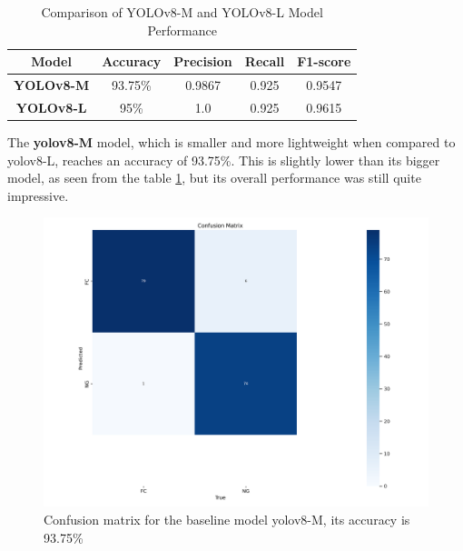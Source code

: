 \begin{table}[ht!]
    \centering
    \begin{tabular}{|c|c|c|c|c|}
        \hline
        \textbf{Model} & \textbf{Accuracy} & \textbf{Precision} & \textbf{Recall} & \textbf{F1-score} \\ \hline
        \textbf{YOLOv8-M} & 93.75\% & 0.9867 & 0.925 & 0.9547 \\ \hline
        \textbf{YOLOv8-L} & 95\% & 1.0 & 0.925 & 0.9615 \\ \hline
    \end{tabular}
    \caption{Comparison of YOLOv8-M and YOLOv8-L Model Performance}
    \label{tab:yolov8_performance}
\end{table}


The \textbf{\gls{yolo}v8-M} model, which is smaller and more lightweight when compared to \gls{yolo}v8-L, reaches an accuracy of 93.75\%. This is slightly lower than its bigger model, as seen from the table \ref{tab:yolov8_performance}, but its overall performance was still quite impressive.

\begin{figure}[ht!]
    \centering
    \includegraphics[width=1.3\linewidth]{Rohit_Master_Thesis//Images/yolov8m_confusion_matrix.png}
    \caption{Confusion matrix for the baseline model \gls{yolo}v8-M, its accuracy is 93.75\%}
    \label{fig:yolov8m confusion matrix}
\end{figure}

